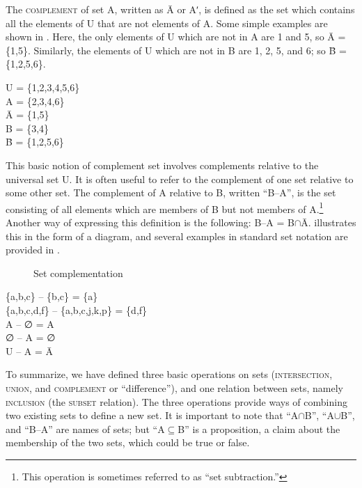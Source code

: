 The \textsc{complement} of set A, written as \=A or Aʹ, is defined as the set which contains all the elements of U that are not elements of A. Some simple examples are shown in . Here, the only elements of U which are not in A are 1 and 5, so \=A = \{1,5\}. Similarly, the elements of U which are not in B are 1, 2, 5, and 6; so \=B = \{1,2,5,6\}.


\ea \label{ex:13.17}
U = \{1,2,3,4,5,6\}\\
A = \{2,3,4,6\}\\
\=A = \{1,5\}\\
B = \{3,4\}\\
\=B = \{1,2,5,6\}
\z


This basic notion of complement set involves complements relative to the universal set U. It is often useful to refer to the complement of one set relative to some other set. The complement of A relative to B, written “B–A”, is the set consisting of all elements which are members of B but not members of A.\footnote{This operation is sometimes referred to as “set subtraction.”} Another way of expressing this definition is the following: B–A = B${\cap}$\=A.  illustrates this in the form of a diagram, and several examples in standard set notation are provided in .

\begin{figure}
\caption{\label{fig:key:4} Set complementation}
\end{figure}

\begin{stylepoints}
\{a,b,c\} – \{b,c\} = \{a\}\\
\{a,b,c,d,f\} – \{a,b,c,j,k,p\} = \{d,f\}\\
A – ∅ = A\\
∅ – A = ∅\\
U – A = \=A
\end{stylepoints}


To summarize, we have defined three basic operations on sets (\textsc{intersection}, \textsc{union}, and \textsc{complement} or “difference”), and one relation between sets, namely \textsc{inclusion} (the \textsc{subset} relation). The three operations provide ways of combining two existing sets to define a new set. It is important to note that “A${\cap}$B”, “A${\cup}$B”, and “B–A” are names of sets; but “A${\subseteq}$B” is a proposition, a claim about the membership of the two sets, which could be true or false.



